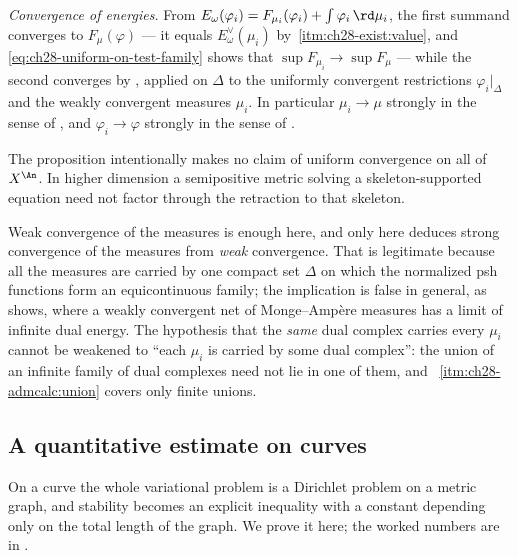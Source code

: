 \emph{Convergence of energies.}  From
$E_\omega(\varphi_i)=F_{\mu_i}(\varphi_i)+\int\varphi_i\,\rd\mu_i$, the
first summand converges to $F_\mu(\varphi)$ --- it equals
$E^\vee_\omega(\mu_i)$ by
\,\cref{itm:ch28-exist:value}, and
\eqref{eq:ch28-uniform-on-test-family} shows that
$\sup F_{\mu_i}\to\sup F_\mu$ --- while the second converges by
, applied on $\Delta$ to the uniformly
convergent restrictions $\varphi_i|_\Delta$ and the weakly convergent
measures $\mu_i$.  In particular $\mu_i\to\mu$ strongly in the sense of
, and
$\varphi_i\to\varphi$ strongly in the sense of .

The proposition intentionally makes no claim of uniform convergence on all
of $X^{\An}$.  In higher dimension a semipositive metric solving a
skeleton-supported equation need not factor through the retraction to that
skeleton.

\begin{warning}{Weak convergence of the measures is enough here, and only
here}
 deduces strong convergence of the
measures from \emph{weak} convergence.  That is legitimate because all the
measures are carried by one compact set $\Delta$ on which the normalized
psh functions form an equicontinuous family; the implication is false in
general, as  shows, where a weakly
convergent net of Monge--Amp\`ere measures has a limit of infinite dual
energy.  The hypothesis that the \emph{same} dual complex carries every
$\mu_i$ cannot be weakened to ``each $\mu_i$ is carried by some dual
complex'': the union of an infinite family of dual complexes need not lie in
one of them, and \,%
\cref{itm:ch28-admcalc:union} covers only finite unions.
\end{warning}

\subsection{A quantitative estimate on curves}
\label{sec:ch28-curve-stability}

On a curve the whole variational problem is a Dirichlet problem on a metric
graph, and stability becomes an explicit inequality with a constant
depending only on the total length of the graph.  We prove it here; the
worked numbers are in .

